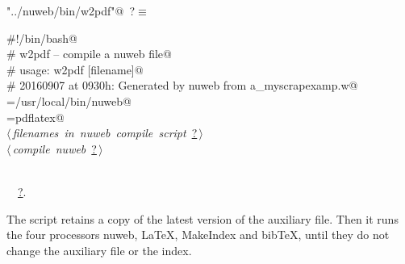\documentclass[twoside]{artikel3}
\renewcommand{\NWlink}[2]{\hyperlink{#1}{#2}}
\renewcommand{\NWtarget}[2]{\hypertarget{#1}{#2}}
\renewcommand{\NWsep}{$\diamond$\rule[-1\baselineskip]{0pt}{1\baselineskip}}
\renewcommand{\NWlink}[2]{\hyperlink{#1}{#2}}
\renewcommand{\NWtarget}[2]{\hypertarget{#1}{#2}}
\begin{document}
\begin{flushleft} \small
\begin{minipage}{\linewidth}\label{scrap22}\raggedright\small
\NWtarget{nuweb?}{} \verb@"../nuweb/bin/w2pdf"@\nobreak\ {\footnotesize {?}}$\equiv$
\vspace{-1ex}
\begin{list}{}{} \item
\mbox{}\verb@#!/bin/bash@\\
\mbox{}\verb@# w2pdf -- compile a nuweb file@\\
\mbox{}\verb@# usage: w2pdf [filename]@\\
\mbox{}\verb@# 20160907 at 0930h: Generated by nuweb from a_myscrapexamp.w@\\
\mbox{}\verb@NUWEB=/usr/local/bin/nuweb@\\
\mbox{}\verb@LATEXCOMPILER=pdflatex@\\
\mbox{}\verb@@\hbox{$\langle\,${\itshape filenames in nuweb compile script}\nobreak\ {\footnotesize \NWlink{nuweb?}{?}}$\,\rangle$}\verb@@\\
\mbox{}\verb@@\hbox{$\langle\,${\itshape compile nuweb}\nobreak\ {\footnotesize \NWlink{nuweb?}{?}}$\,\rangle$}\verb@@\\
\mbox{}\verb@@\\
\mbox{}\verb@@{\NWsep}
\end{list}
\vspace{-1.5ex}
\footnotesize
\begin{list}{}{\setlength{\itemsep}{-\parsep}\setlength{\itemindent}{-\leftmargin}}
\item \NWtxtIdentsUsed\nobreak\  \verb@nuweb@\nobreak\ \NWlink{nuweb?}{?}.
\item{}
\end{list}
\end{minipage}\vspace{4ex}
\end{flushleft}
The script retains a copy of the latest version of the auxiliary file.
Then it runs the four processors nuweb, \LaTeX{}, MakeIndex and bib\TeX{}, until
they do not change the auxiliary file or the index. 
\end{document}
